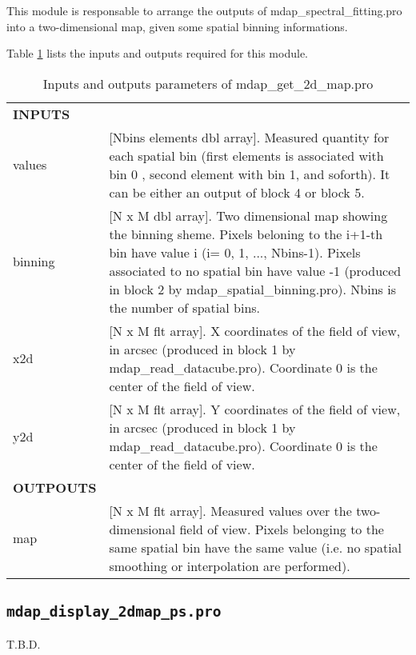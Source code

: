 \documentclass[11pt]{book}
\begin{document}
This module is responsable to arrange the outputs of
mdap\_spectral\_fitting.pro into a two-dimensional map, given some
spatial binning informations. 

Table \ref{dap_tab:mdap_get_2d_map} lists the inputs and
outputs required for this module.



\begin{center}
\begin{longtable}{p{2.7cm}| p{11.1cm}}
\caption{Inputs and outputs parameters of mdap\_get\_2d\_map.pro} \label{dap_tab:mdap_get_2d_map} \\
\hline
\endfirsthead
\hline
\endhead
\hline
\endlastfoot
\hline
{\bf  INPUTS} &  \\
%
values   &   [Nbins elements dbl array].  Measured quantity for each spatial bin (first elements is associated with bin 0 , 
            second element with bin 1, and soforth). It can be either an output of block 4 or block 5. \\
%
binning  &   [N x M dbl array]. Two dimensional map showing the binning sheme. Pixels beloning to the i+1-th 
                               bin have value i (i= 0, 1, ..., Nbins-1). Pixels associated to no spatial bin
                               have value -1 (produced in block 2 by mdap\_spatial\_binning.pro). Nbins is the number of spatial bins. \\
%
x2d      & [N x M flt array].  X coordinates of the field of view, in arcsec (produced in block 1 by mdap\_read\_datacube.pro). Coordinate 0 is the center of the field of view.\\
%
y2d      & [N x M flt array].  Y coordinates of the field of view, in arcsec (produced in block 1 by mdap\_read\_datacube.pro). Coordinate 0 is the center of the field of view.\\
%
\hline
{\bf OUTPOUTS}        &    \\
%
map      & [N x M flt array].  Measured values over the two-dimensional field of view. Pixels belonging to the same spatial bin 
                               have the same value (i.e. no spatial smoothing or interpolation are performed). \\
\hline
\end{longtable}
\end{center}



\subsection{{\tt mdap\_display\_2dmap\_ps.pro}}
\label{dap_sec:mdap_display_2dmap_ps}
T.B.D.


%
%
	
\end{document}
